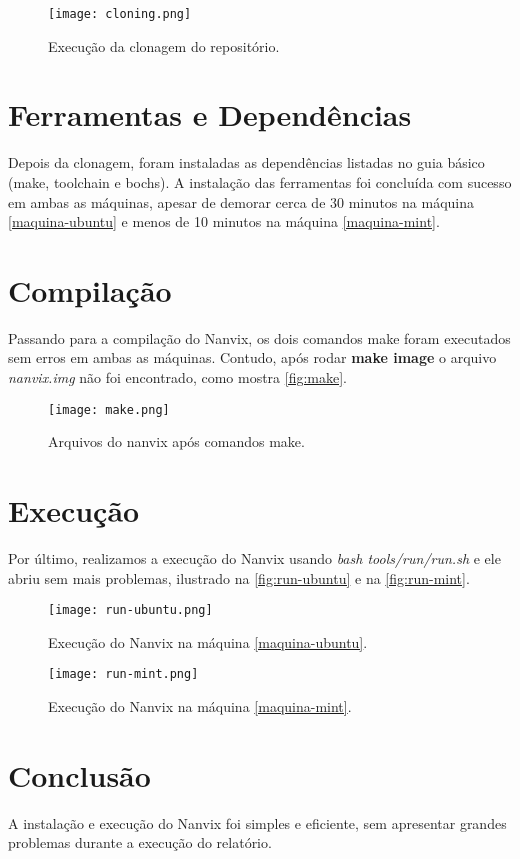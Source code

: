 \documentclass[12pt,
    oneside,
    brazil,
    sumario=tradicional,
    article,
    a4paper
]{abntex2}
\begin{document}
    \begin{figure}[!htb]
        \centering
        \texttt{[image: cloning.png]}
        \caption{Execução da clonagem do repositório.}
        \label{fig:cloning}
    \end{figure}
    
    \section{Ferramentas e Dependências}

    Depois da clonagem, foram instaladas as dependências listadas no guia básico (make, toolchain e bochs).
    A instalação das ferramentas foi concluída com sucesso em ambas as máquinas, apesar de demorar cerca de 30 minutos na máquina \ref{maquina-ubuntu} e menos de 10 minutos na máquina \ref{maquina-mint}.

    \section{Compilação}\label{sec:compilacao}

    Passando para a compilação do Nanvix, os dois comandos make foram executados sem erros em ambas as máquinas.
    Contudo, após rodar \textbf{make image} o arquivo \textit{nanvix.img} não foi encontrado, como mostra \autoref{fig:make}.

    \begin{figure}[!htb]
        \centering
        \texttt{[image: make.png]}
        \caption{Arquivos do nanvix após comandos make.}
        \label{fig:make}
    \end{figure}

    \section{Execução}\label{sec:execucao}

    Por último, realizamos a execução do Nanvix usando \textit{bash tools/run/run.sh} e ele abriu sem mais problemas, ilustrado na \autoref{fig:run-ubuntu} e na \autoref{fig:run-mint}.

    \begin{figure}[!htb]
        \centering
        \texttt{[image: run-ubuntu.png]}
        \caption{Execução do Nanvix na máquina \ref{maquina-ubuntu}.}
        \label{fig:run-ubuntu}
    \end{figure}

    \begin{figure}[!htb]
        \centering
        \texttt{[image: run-mint.png]}
        \caption{Execução do Nanvix na máquina \ref{maquina-mint}.}
        \label{fig:run-mint}
    \end{figure}

    \section{Conclusão}\label{conclusao}

    A instalação e execução do Nanvix foi simples e eficiente, sem apresentar grandes problemas durante a execução do relatório.
\end{document}
